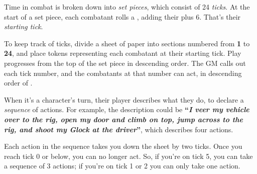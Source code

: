 
Time in combat is broken down into \emph{set pieces}, which consist of 24 \emph{ticks}. At the start of a set piece, each combatant rolls a , adding their  plus 6. That's their \emph{starting tick}.

To keep track of ticks, divide a sheet of paper into sections numbered from \textbf{1} to \textbf{24}, and place tokens representing each combatant at their starting tick. Play progresses from the top of the set piece in descending order. The GM calls out each tick number, and the combatants at that number can act, in descending order of .

When it's a character's turn, their player describes what they do, to declare a \emph{sequence} of actions. For example, the description could be \textbf{``\emph{I veer my vehicle over to the rig, open my door and climb on top, jump across to the rig, and shoot my Glock at the driver}''}, which describes four actions.

Each action in the sequence takes you down the sheet by two ticks. Once you reach tick 0 or below, you can no longer act. So, if you're on tick 5, you can take a sequence of 3 actions; if you're on tick 1 or 2 you can only take one action.
